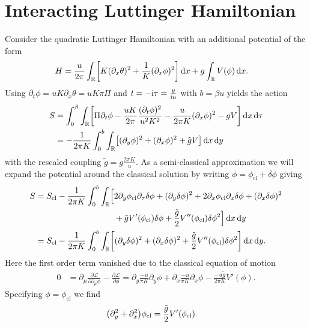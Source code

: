 \documentclass[english, parskip=full]{scrartcl}
\begin{document}
\section{Interacting Luttinger Hamiltonian}
Consider the quadratic Luttinger Hamiltonian with an additional potential of the form
\begin{align}
H &= \frac{u}{2\pi} \intr{\klb*{K(\partial_x\theta)^2 + \frac{1}{K} (\partial_x\phi)^2}}{x} + g\intr{V(\phi)}{x}.
\end{align}
Using $\partial_t\phi = uK\partial_x\theta = uK\pi\Pi$ and $t=-\text{i}\tau = \frac{y}{\text{i} u}$ with $b=\beta u$ yields the action
\begin{align}
S &= \intx{0}{\beta}{\intr{\klb*{\Pi \partial_t\phi - \frac{uK}{2\pi} \frac{(\partial_t\phi)^2}{u^2K^2} - \frac{u}{2\pi K} (\partial_x\phi)^2 - gV}}{x}}{\tau} \\
&= -\frac{1}{2\pi K} \intx{0}{b}{\intr{\klb*{(\partial_y\phi)^2 + (\partial_x\phi)^2 + \tilde{g} V}}{x} }{y}
\end{align}
with the rescaled coupling $\tilde{g} = g\frac{2\pi K}{u}$.
As a semi-classical approximation we will expand the potential around the classical solution by writing $\phi=\phi_\text{cl} + \delta\phi$ giving
\begin{align}
S &= \bsplit{S_\text{cl} - \frac{1}{2\pi K}\intx{0}{b}{\intr{\klb[\Big]{&2\partial_y\phi_\text{cl} \partial_\tau\delta\phi + (\partial_y\delta\phi)^2 + 2\partial_x\phi_\text{cl} \partial_x\delta\phi + (\partial_x\delta\phi)^2 \\
&+ \tilde{g} V'(\phi_\text{cl}) \delta\phi + \frac{\tilde{g}}{2} V''(\phi_\text{cl}) \delta\phi^2}}{x} }{y}}\\
&= S_\text{cl} - \frac{1}{2\pi K} \intx{0}{b}{\intr{\klb*{(\partial_y\delta\phi)^2 + (\partial_x\delta\phi)^2 + \frac{\tilde{g}}{2} V''(\phi_\text{cl})\delta\phi^2}}{x} }{y}.
\end{align}
Here the first order term vanished due to the classical equation of motion
\begin{align}
0 &= \partial_\mu \frac{\partial\mathcal{L}}{\partial \partial_\mu\phi} - \frac{\partial\mathcal{L}}{\partial\phi} = \partial_y \frac{-u}{\pi K} \partial_y\phi + \partial_x \frac{-u}{\pi K} \partial_x\phi - \frac{-u\tilde{g}}{2\pi K} V'(\phi).
\end{align}
Specifying $\phi=\phi_\text{cl}$ we find
\begin{align}
\kla*{\partial_y^2 + \partial_x^2}\phi_\text{cl} &= \frac{\tilde{g}}{2} V'(\phi_\text{cl}).
\end{align}
\end{document}
